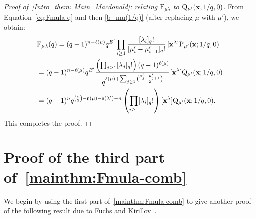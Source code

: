 \documentclass[12pt,a4paper,reqno]{amsart}
\theoremstyle{plain}
\theoremstyle{definition}
\newcommand{\1}{\mathds{1}}
\renewcommand{\P}{\mathrm{P}}
\newcommand{\F}{\mathrm{F}}
\newcommand{\Q}{\mathrm{Q}}
\newcommand{\x}{{\bf x}}
\newcommand{\fn}{\mathsf{n}}
\begin{document}
\begin{proof}[Proof of~\cref{Intro_them: Main_Macdonald}:
relating $\F_{\mu\lambda}$ to  $\Q_{\mu'}(\x,1/q,0)$]  
From Equation~\cref{eq:Fmula-q} and then \cref{b_mu(1/q)} (after replacing $\mu$ with $\mu'$), we obtain: 
\begin{equation*}
\begin{split}
&\F_{\mu\lambda}(q)=(q-1)^{n-\ell(\mu)}q^{E'}\prod_{i\geq 1}\frac{[\lambda_i]_q!}{[\mu_i'-\mu_{i+1}']_q!}\, [\x^\lambda]\P_{\mu'}(\x;1/q,0) \\
&=(q-1)^{n-\ell(\mu)}q^{E'}\frac{\left(\prod_{j\geq 1}[\lambda_j]_q!\right)(q-1)^{\ell(\mu)}}{q^{\ell(\mu)+\sum_{j\geq 1}\binom{\mu_j'-\mu'_{j+1}}{2}}}[\x^\lambda]\Q_{\mu'}(\x;1/q,0)\\
&=(q-1)^n q^{\binom{n}{2} - \fn(\mu) - \fn(\lambda') - n} \left( \prod_{i \geq 1} [\lambda_i]_q! \right) [\x^\lambda] \Q_{\mu'}(\x; 1/q, 0).
\end{split}
\end{equation*}
This completes the proof. 
\end{proof}


\section{Proof of the third part of~\cref{mainthm:Fmula-comb}} We begin by using the first part of~\cref{mainthm:Fmula-comb} to give another proof of the following result due to Fuchs and Kirillov~\cite[Theorem 4.1]{Fuchs-Kirillov}.
\end{document}
